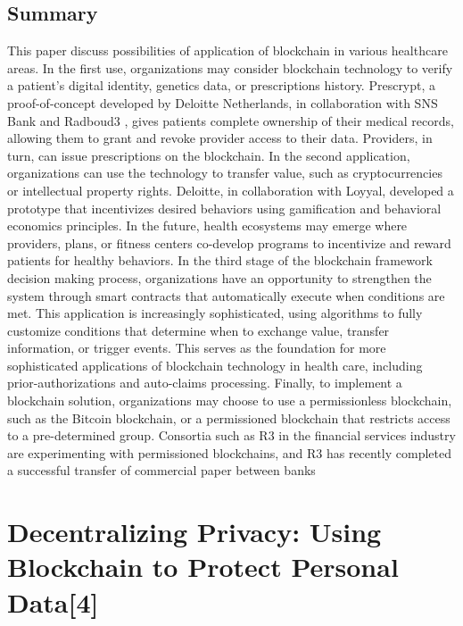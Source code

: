 \documentclass[11pt]{report}
\begin{document}
\subsection{Summary}
This paper discuss possibilities of application of blockchain in various healthcare areas.
In the first use, organizations may consider 
blockchain technology to verify a patient’s 
digital identity, genetics data, or 
prescriptions history. Prescrypt, a 
proof-of-concept developed by Deloitte 
Netherlands, in collaboration with SNS Bank 
and Radboud3
, gives patients complete 
ownership of their medical records, allowing 
them to grant and revoke provider access to 
their data. Providers, in turn, can issue 
prescriptions on the blockchain. In the 
second application, organizations can use 
the technology to transfer value, such as 
cryptocurrencies or intellectual property 
rights. Deloitte, in collaboration with Loyyal, 
developed a prototype that incentivizes 
desired behaviors using gamification and 
behavioral economics principles. In the 
future, health ecosystems may emerge 
where providers, plans, or fitness centers 
co-develop programs to incentivize and 
reward patients for healthy behaviors.  
In the third stage of the blockchain 
framework decision making process, 
organizations have an opportunity to 
strengthen
 the system through smart 
contracts that automatically execute when 
conditions are met. This application is 
increasingly sophisticated, using algorithms 
to fully customize conditions that determine 
when to exchange value, transfer 
information, or trigger events. This serves as 
the foundation for more sophisticated 
applications of blockchain technology in 
health care, including prior-authorizations 
and auto-claims processing.
Finally, to 
implement
 a blockchain solution, 
organizations may choose to use a 
permissionless blockchain, such as the 
Bitcoin blockchain, or a permissioned 
blockchain that restricts access to a 
pre-determined group. Consortia such as R3 
in the financial services industry are 
experimenting with permissioned 
blockchains, and R3 has recently completed 
a successful transfer of commercial paper 
between banks
\section{Decentralizing Privacy: Using Blockchain to Protect Personal Data[4]}
\end{document}
